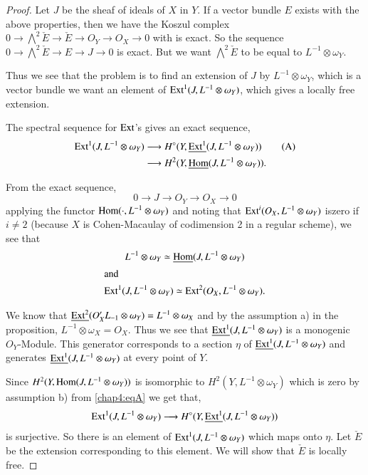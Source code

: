 \begin{proof}
Let $J$ be the sheaf of ideals of $X$ in $Y$. If a vector bundle $E$
exists with the above properties, then we have the Koszul complex $0
\longrightarrow \bigwedge\limits^2\check{E}\longrightarrow\check{E}
\longrightarrow O_Y\longrightarrow O_X\longrightarrow 0$ with is
exact. So the sequence $0\longrightarrow\bigwedge\limits^2 \check{E}
\longrightarrow E\longrightarrow J\longrightarrow 0$ is exact. But we
want $\bigwedge\limits^2\check{E}$ to be equal to $L^{-1}\otimes
\omega_Y$. 

Thus we see that the problem is to find an extension of $J$ by
$L^{-1}\otimes\omega_Y$, which is a vector bundle \ie we want an
element of $\operatorname{Ext}^1(J,L^{-1}\otimes\omega_Y)$, which gives a locally
free extension. 

The spectral sequence for $\operatorname{Ext}$'s gives an exact sequence,
\begin{align*}
\operatorname{Ext}^1(J,L^{-1}\otimes\omega_Y) &\longrightarrow H^\circ(Y,
\underline{\operatorname{Ext}^1}(J,L^{-1}\otimes\omega_Y))\tag{A}\label{chap4:eqA}\\
&\longrightarrow H^2(Y, \underline{\operatorname{Hom}}(J,L^{-1}\otimes \omega_Y)).
\end{align*}

From the exact sequence,
$$
0\longrightarrow J\longrightarrow O_Y\longrightarrow
O_X\longrightarrow 0
$$
applying the functor $\operatorname{Hom}( \cdot , L^{-1}\otimes\omega_Y)$ and noting that
$\operatorname{Ext}^i(O_X,L^{-1}\otimes\omega_Y)$ is\pageoriginale zero if $i\neq 2$
(because $X$ is Cohen-Macaulay of codimension 2 in a regular scheme),
we see that 
\begin{gather*}
L^{-1}\otimes\omega_Y\simeq\underline{\operatorname{Hom}}(J,L^{-1}\otimes\omega_Y)\\ 
\intertext{and}
\operatorname{Ext}^1(J,L^{-1}\otimes\omega_Y)\simeq\operatorname{Ext}^2(O_X,L^{-1}\otimes\omega_Y). 
\end{gather*}

We know that $\underline{\operatorname{Ext}^2}(O_X'L_{-1}\otimes\omega_Y)=L^{-1}
\otimes\omega_X$ and by the assumption a) in the proposition,
$L^{-1}\otimes\omega_X=O_X$. Thus we see that
$\underline{\operatorname{Ext}^1}(J,L^{-1}\otimes\omega_Y)$ is a monogenic
$O_Y$-Module. This generator corresponds to a section $\eta$ of
$\underline{\operatorname{Ext}^1}(J,L^{-1}\otimes\omega_Y)$ and generates
$\underline{\operatorname{Ext}^1}(J,L^{-1}\otimes\omega_Y)$ at every point of $Y$.

Since $H^2(Y,\operatorname{Hom}(J,L^{-1}\otimes\omega_Y))$ is isomorphic to
$H^2(Y,L^{-1}\otimes\omega_Y)$ which is zero by assumption b) from
\eqref{chap4:eqA} we get that,
$$
\operatorname{Ext}^1(J,L^{-1}\otimes\omega_Y)\longrightarrow H^\circ(Y,
\underline{\operatorname{Ext}^1}(J,L^{-1}\otimes\omega_Y))
$$
is surjective. So there is an element of $\operatorname{Ext}^1(J,L^{-1}\otimes
\omega_Y)$ which maps onto $\eta$. Let $\check{E}$ be the extension
corresponding to this element. We will show that $\check{E}$ is
locally free.


\end{proof}
